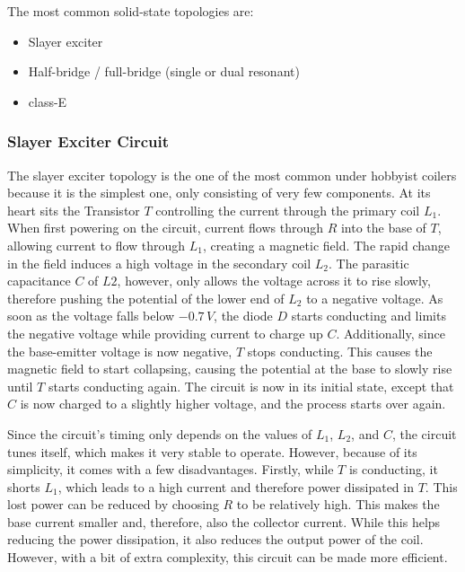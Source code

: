 The most common solid-state topologies are:
\begin{itemize}
\item Slayer exciter
\item Half-bridge / full-bridge (single or dual resonant)
\item class-E
\end{itemize}

\subsubsection{Slayer Exciter Circuit}

The slayer exciter topology is the one of the most common under hobbyist coilers because it is the simplest one, only consisting of very few components. At its heart sits the Transistor \(T\) controlling the current through the primary coil \(L_1\). When first powering on the circuit, current flows through \(R\) into the base of \(T\), allowing current to flow through \(L_1\), creating a magnetic field. The rapid change in the field induces a high voltage in the secondary coil \(L_2\). The parasitic capacitance \(C\) of \(L2\), however, only allows the voltage across it to rise slowly, therefore pushing the potential of the lower end of \(L_2\) to a negative voltage. As soon as the voltage falls below \(-0.7\,V\), the diode \(D\) starts conducting and limits the negative voltage while providing current to charge up \(C\). Additionally, since the base-emitter voltage is now negative, \(T\) stops conducting. This causes the magnetic field to start collapsing, causing the potential at the base to slowly rise until \(T\) starts conducting again. The circuit is now in its initial state, except that \(C\) is now charged to a slightly higher voltage, and the process starts over again.

Since the circuit's timing only depends on the values of \(L_1\), \(L_2\), and \(C\), the circuit tunes itself, which makes it very stable to operate. However, because of its simplicity, it comes with a few disadvantages. Firstly, while \(T\) is conducting, it shorts \(L_1\), which leads to a high current and therefore power dissipated in \(T\). This lost power can be reduced by choosing \(R\) to be relatively high. This makes the base current smaller and, therefore, also the collector current. While this helps reducing the power dissipation, it also reduces the output power of the coil. However, with a bit of extra complexity, this circuit can be made more efficient.

